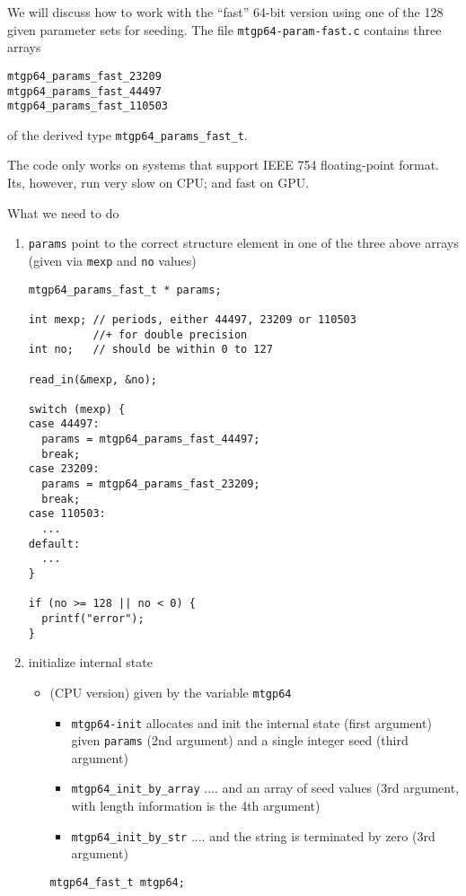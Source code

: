 We will discuss how to work with the ``fast'' 64-bit version using one
of the 128 given parameter sets for seeding.  The file
\verb!mtgp64-param-fast.c! contains three arrays
\begin{verbatim}
mtgp64_params_fast_23209
mtgp64_params_fast_44497
mtgp64_params_fast_110503
\end{verbatim}
of the derived type \verb!mtgp64_params_fast_t!.

\begin{framed}
  The code only works on systems that support IEEE 754 floating-point
  format. Its, however, run very slow on CPU; and fast on GPU.
\end{framed}

What we need to do
\begin{enumerate}
\item \verb!params! point to the correct structure element in one of
  the three above arrays (given via \verb!mexp! and \verb!no! values)
\begin{lstlisting}
mtgp64_params_fast_t * params;

int mexp; // periods, either 44497, 23209 or 110503
          //+ for double precision
int no;   // should be within 0 to 127

read_in(&mexp, &no);

switch (mexp) {
case 44497:
  params = mtgp64_params_fast_44497;
  break;
case 23209:
  params = mtgp64_params_fast_23209;
  break;
case 110503:
  ...
default:
  ...
}

if (no >= 128 || no < 0) {
  printf("error");
}
\end{lstlisting}

\item initialize internal state
  \begin{itemize}
  \item (CPU version) given by the variable \verb!mtgp64!
  \begin{itemize}
  \item  \verb!mtgp64-init! allocates and init the
    internal state (first argument) given \verb!params! (2nd argument)
    and a single integer seed (third argument)
  \item  \verb!mtgp64_init_by_array! .... and an array of
    seed values (3rd argument, with length information is the 4th
    argument)
  \item  \verb!mtgp64_init_by_str! .... and the string is
    terminated by zero (3rd argument)
  \end{itemize}
\begin{lstlisting}
mtgp64_fast_t mtgp64;


\end{lstlisting}
\end{itemize}
\end{enumerate}

